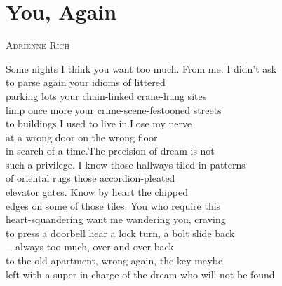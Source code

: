 \documentclass[parskip=half-,12pt,oneside,openany,a5paper,numbers=endperiod]{scrbook}
\begin{document}
\appendix

\chapter{You, Again}

{}\hfill\textsc{Adrienne Rich}


Some nights I think you want too much. From me. I didn't ask\\
to parse again your idioms of littered\\
parking lots your chain-linked crane-hung sites\\
limp once more your crime-scene-festooned streets\\
to buildings I used to live in.\quad Lose my nerve\\
at a wrong door on the wrong floor\\
in search of a time.\quad The precision of dream is not\\
such a privilege. I know those hallways tiled in patterns\\
of oriental rugs those accordion-pleated\\
elevator gates. Know by heart the chipped\\
edges on some of those tiles. You who require this\\
heart-squandering want me wandering you, craving\\
to press a doorbell hear a lock turn, a bolt slide back\\
---always too much, over and over back\\
to the old apartment, wrong again, the key maybe\\
left with a super in charge of the dream who will not be found

\end{document}
